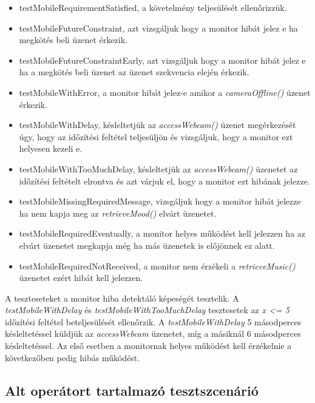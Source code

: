 \begin{itemize}
    \item testMobileRequirementSatisfied, a követelmény teljesülését ellenőrizzük.
    \item testMobileFutureConstraint, azt vizsgáljuk hogy a monitor hibát jelez e ha megkötés beli üzenet érkezik.
    \item testMobileFutureConstraintEarly, azt vizsgáljuk hogy a monitor hibát jelez e ha a megkötés beli üzenet az üzenet szekvencia elején érkezik.
    \item testMobileWithError, a monitor hibát jelez-e amikor a \textit{cameraOffline()} üzenet érkezik.
    \item testMobileWithDelay, késleltetjük az \textit{accessWebcam()} üzenet megérkezését úgy, hogy az időzítési feltétel teljesüljön és vizsgáljuk, hogy a monitor ezt helyesen kezeli e.
    \item testMobileWithTooMuchDelay, késleltetjük az \textit{accessWebcam()} üzenetet  az időzítési feltételt elrontva és azt várjuk el, hogy a monitor ezt hibának jelezze.
    \item testMobileMissingRequiredMessage, vizsgáljuk hogy a monitor hibát jelezze ha nem kapja meg az \textit{retrieveMood()} elvárt üzenetet.
    \item testMobileRequiredEventually, a monitor helyes működést kell jelezzen ha az elvárt üzenetet megkapja még ha más üzenetek is előjönnek ez alatt.
    \item testMobileRequiredNotReceived, a monitor nem érzékeli a \textit{retrieveMusic()} üzenetet ezért hibát kell jelezzen.
\end{itemize}

A teszteseteket a monitor hiba detektáló képeségét tesztelik.
A \textit{testMobileWithDelay} és \textit{testMobileWithTooMuchDelay} tesztesetek az \textit{x <= 5} időzítési feltétel beteljesülését ellenőrzik.
A \textit{testMobileWithDelay} 5 másodperces késleltetéssel küldjük az \textit{accessWebcam} üzenetet, míg a másiknál 6 másodperces késleltetéssel.
Az első esetben a monitornak helyes működést kell érzékelnie a következőben pedig hibás működést.

\subsection{Alt operátort tartalmazó tesztszcenárió}

